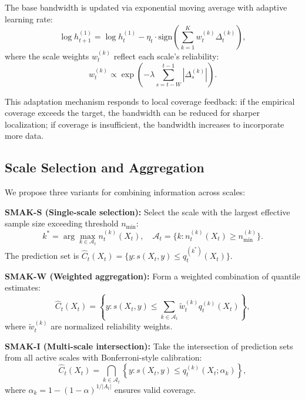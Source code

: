 \documentclass{article}
\theoremstyle{definition}
\begin{document}
The base bandwidth is updated via exponential moving average with adaptive learning rate:
\begin{equation}
\log h_{t+1}^{(1)} = \log h_t^{(1)} - \eta_t \cdot \text{sign}\left(\sum_{k=1}^K w_t^{(k)} \Delta_t^{(k)}\right),
\end{equation}
where the scale weights $w_t^{(k)}$ reflect each scale's reliability:
\begin{equation}
w_t^{(k)} \propto \exp\left(-\lambda \sum_{s=t-W}^{t-1} |\Delta_s^{(k)}|\right).
\end{equation}

This adaptation mechanism responds to local coverage feedback: if the empirical coverage exceeds the target, the bandwidth can be reduced for sharper localization; if coverage is insufficient, the bandwidth increases to incorporate more data.

\subsection{Scale Selection and Aggregation}

We propose three variants for combining information across scales:

\textbf{SMAK-S (Single-scale selection):} Select the scale with the largest effective sample size exceeding threshold $n_{\min}$:
\begin{equation}
k^* = \arg\max_{k \in \mathcal{A}_t} n_t^{(k)}(X_t), \quad \mathcal{A}_t = \{k : n_t^{(k)}(X_t) \geq n_{\min}^{(k)}\}.
\end{equation}
The prediction set is $\hat{C}_t(X_t) = \{y : s(X_t, y) \leq q_t^{(k^*)}(X_t)\}$.

\textbf{SMAK-W (Weighted aggregation):} Form a weighted combination of quantile estimates:
\begin{equation}
\hat{C}_t(X_t) = \left\{y : s(X_t, y) \leq \sum_{k \in \mathcal{A}_t} \tilde{w}_t^{(k)} q_t^{(k)}(X_t)\right\},
\end{equation}
where $\tilde{w}_t^{(k)}$ are normalized reliability weights.

\textbf{SMAK-I (Multi-scale intersection):} Take the intersection of prediction sets from all active scales with Bonferroni-style calibration:
\begin{equation}
\hat{C}_t(X_t) = \bigcap_{k \in \mathcal{A}_t} \left\{y : s(X_t, y) \leq q_t^{(k)}(X_t; \alpha_k)\right\},
\end{equation}
where $\alpha_k = 1 - (1-\alpha)^{1/|A_t|}$ ensures valid coverage.
\end{document}
